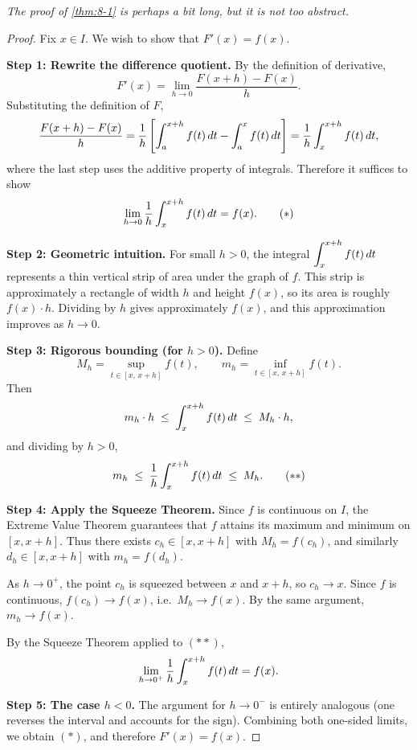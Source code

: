 \textit{The proof of \cref{thm:8-1} is perhaps a bit long, but it is not too abstract.}

\begin{proof}
Fix $x \in I$.  We wish to show that $F'(x) = f(x)$.

\textbf{Step 1: Rewrite the difference quotient.}  By the definition of derivative,
\[
  F'(x) = \lim_{h \to 0} \frac{F(x+h) - F(x)}{h}.
\]
Substituting the definition of $F$,
\[
  \frac{F(x+h) - F(x)}{h}
  = \frac{1}{h}\left[\int_{a}^{x+h} f(t)\,dt - \int_{a}^{x} f(t)\,dt\right]
  = \frac{1}{h}\int_{x}^{x+h} f(t)\,dt,
\]
where the last step uses the additive property of integrals.  Therefore it suffices to show
\[
  \lim_{h \to 0} \frac{1}{h}\int_{x}^{x+h} f(t)\,dt = f(x). \tag{$\ast$}
\]


\textbf{Step 2: Geometric intuition.}  For small $h > 0$, the integral $\displaystyle\int_{x}^{x+h} f(t)\,dt$ represents a thin vertical strip of area under the graph of $f$.  This strip is approximately a rectangle of width $h$ and height $f(x)$, so its area is roughly $f(x)\cdot h$.  Dividing by $h$ gives approximately $f(x)$, and this approximation improves as $h \to 0$.

\textbf{Step 3: Rigorous bounding (for $h > 0$).}  Define
\[
  M_{h} = \sup_{t \in [x,\,x+h]} f(t), \qquad m_{h} = \inf_{t \in [x,\,x+h]} f(t).
\]
Then
\[
  m_{h}\cdot h \;\le\; \int_{x}^{x+h} f(t)\,dt \;\le\; M_{h}\cdot h,
\]
and dividing by $h > 0$,
\[
  m_{h} \;\le\; \frac{1}{h}\int_{x}^{x+h} f(t)\,dt \;\le\; M_{h}. \tag{$\ast\ast$}
\]


\textbf{Step 4: Apply the Squeeze Theorem.}  Since $f$ is continuous on $I$, the Extreme Value Theorem guarantees that $f$ attains its maximum and minimum on $[x, x+h]$.  Thus there exists $c_{h} \in [x, x+h]$ with $M_{h} = f(c_{h})$, and similarly $d_{h} \in [x, x+h]$ with $m_{h} = f(d_{h})$.

As $h \to 0^{+}$, the point $c_{h}$ is squeezed between $x$ and $x+h$, so $c_{h} \to x$.  Since $f$ is continuous, $f(c_{h}) \to f(x)$, i.e.\ $M_{h} \to f(x)$.  By the same argument, $m_{h} \to f(x)$.

By the Squeeze Theorem applied to $(\ast\ast)$,
\[
  \lim_{h \to 0^{+}} \frac{1}{h}\int_{x}^{x+h} f(t)\,dt = f(x).
\]


\textbf{Step 5: The case $h < 0$.}  The argument for $h \to 0^{-}$ is entirely analogous (one reverses the interval and accounts for the sign).  Combining both one-sided limits, we obtain $(\ast)$, and therefore $F'(x) = f(x)$.
\end{proof}

